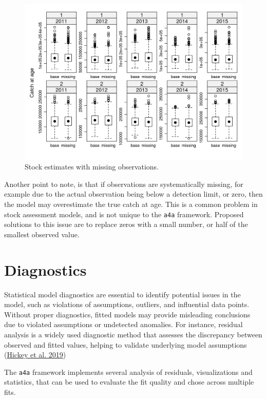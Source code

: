 \documentclass[
]{book}
\begin{document}
\begin{figure}
\centering
\includegraphics{_bookdown_files/_main_files/figure-html/obsmissing2-1.png}
\caption{\label{fig:obsmissing2}Stock estimates with missing observations.}
\end{figure}

Another point to note, is that if observations are systematically missing, for example due to the actual observation being below a detection limit, or zero, then the model may overestimate the true catch at age. This is a common problem in stock assessment models, and is not unique to the \texttt{a4a} framework. Proposed solutions to this issue are to replace zeros with a small number, or half of the smallest observed value.

\hypertarget{diagnostics}{%
\chapter{\texorpdfstring{Diagnostics \label{sec:diagn}}{Diagnostics }}\label{diagnostics}}

Statistical model diagnostics are essential to identify potential issues in the model, such as violations of assumptions, outliers, and influential data points. Without proper diagnostics, fitted models may provide misleading conclusions due to violated assumptions or undetected anomalies. For instance, residual analysis is a widely used diagnostic method that assesses the discrepancy between observed and fitted values, helping to validate underlying model assumptions (\protect\hyperlink{ref-hickey2019}{Hickey et al. 2019})

The \texttt{a4a} framework implements several analysis of residuals, visualizations and statistics, that can be used to evaluate the fit quality and chose across multiple fits.
\end{document}
